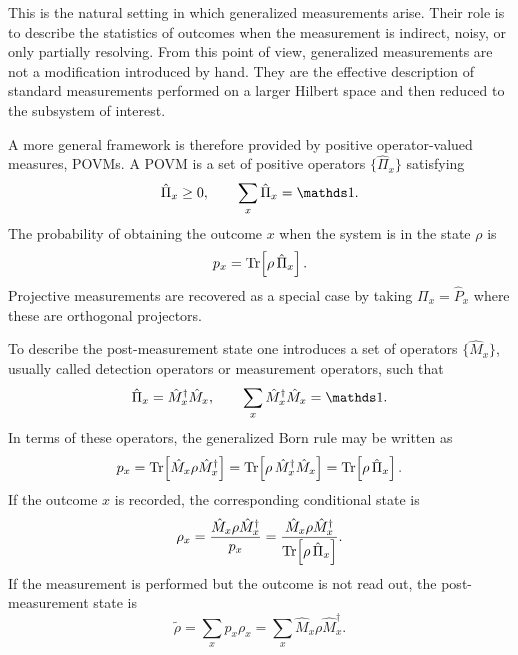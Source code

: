 This is the natural setting in which generalized measurements arise. Their role is to describe the statistics of outcomes when the measurement is indirect, noisy, or only partially resolving. From this point of view, generalized measurements are not a modification introduced by hand. They are the effective description of standard measurements performed on a larger Hilbert space and then reduced to the subsystem of interest.

A more general framework is therefore provided by positive operator-valued measures, POVMs. A POVM is a set of positive operators \(\{\hat \Pi_x\}\) satisfying
\begin{equation}
	\hat \Pi_x \geq 0,
	\qquad
	\sum_x \hat \Pi_x=\id.
	\label{eq:open_qs_povm_definition}
\end{equation}
The probability of obtaining the outcome \(x\) when the system is in the state \(\rho\) is
\begin{equation}
	p_x=\Tr\!\left[\rho\,\hat \Pi_x\right].
	\label{eq:open_qs_povm_born_rule}
\end{equation}
	Projective measurements are recovered as a special case by taking $\Pi_x=\hat P_x$ where these are orthogonal projectors.

To describe the post-measurement state one introduces a set of operators \(\{\hat M_x\}\), usually called detection operators or measurement operators, such that
\begin{equation}
	\hat \Pi_x=\hat M_x^\dagger \hat M_x,
	\qquad
	\sum_x \hat M_x^\dagger \hat M_x=\id.
	\label{eq:open_qs_detection_operators_definition}
\end{equation}
In terms of these operators, the generalized Born rule may be written as
\begin{equation}
	p_x=\Tr\!\left[\hat M_x \rho \hat M_x^\dagger\right]
	=
	\Tr\!\left[\rho\,\hat M_x^\dagger \hat M_x\right]
	=
	\Tr\!\left[\rho\,\hat \Pi_x\right].
	\label{eq:open_qs_detection_operators_born_rule}
\end{equation}
If the outcome \(x\) is recorded, the corresponding conditional state is
\begin{equation}
	\rho_x=\frac{\hat M_x \rho \hat M_x^\dagger}{p_x} = \frac{\hat M_x \rho \hat M_x^\dagger}{\Tr\!\left[\rho\,\hat \Pi_x\right]}.
	\label{eq:open_qs_generalized_reduction_rule}
\end{equation}
If the measurement is performed but the outcome is not read out, the post-measurement state is
\begin{equation}
	\widetilde{\rho}
	=
	\sum_x p_x \rho_x
	=
	\sum_x \hat M_x \rho \hat M_x^\dagger.
	\label{eq:open_qs_nonselective_generalized_measurement}
\end{equation}

